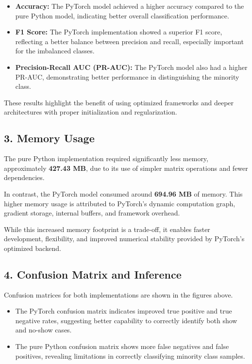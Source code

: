 \documentclass[12pt]{article}
\begin{document}
\begin{itemize}
    \item \textbf{Accuracy:} The PyTorch model achieved a higher accuracy compared to the pure Python model, indicating better overall classification performance.
    \item \textbf{F1 Score:} The PyTorch implementation showed a superior F1 score, reflecting a better balance between precision and recall, especially important for the imbalanced classes.
    \item \textbf{Precision-Recall AUC (PR-AUC):} The PyTorch model also had a higher PR-AUC, demonstrating better performance in distinguishing the minority class.
\end{itemize}

These results highlight the benefit of using optimized frameworks and deeper architectures with proper initialization and regularization.

\subsection{3. Memory Usage}
The pure Python implementation required significantly less memory, approximately \textbf{427.43 MB}, due to its use of simpler matrix operations and fewer dependencies.

In contrast, the PyTorch model consumed around \textbf{694.96 MB} of memory. This higher memory usage is attributed to PyTorch’s dynamic computation graph, gradient storage, internal buffers, and framework overhead.

While this increased memory footprint is a trade-off, it enables faster development, flexibility, and improved numerical stability provided by PyTorch’s optimized backend.

\subsection{4. Confusion Matrix and Inference}
Confusion matrices for both implementations are shown in the figures above.

\begin{itemize}
    \item The PyTorch confusion matrix indicates improved true positive and true negative rates, suggesting better capability to correctly identify both show and no-show cases.
    \item The pure Python confusion matrix shows more false negatives and false positives, revealing limitations in correctly classifying minority class samples.
\end{itemize}
\end{document}
